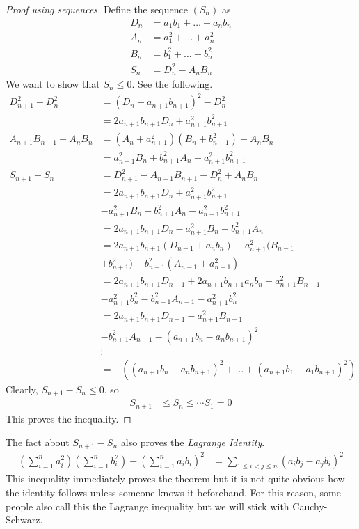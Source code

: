 \documentclass{subfile}
\begin{document}
		\begin{proof}[\itshape Proof using sequences]
			Define the sequence $(S_n)$ as
				\begin{align*}
					D_n
						& = a_1b_1+\ldots+a_nb_n\\
					A_n
						& = a_1^2+\ldots+a_n^2\\
					B_n
						& = b_1^2+\ldots+b_n^2\\
					S_n
						& = D_n^2-A_nB_n
				\end{align*}
			We want to show that $S_n\leq0$. See the following.
				\begin{align*}
					D_{n+1}^2-D_n^2
						& = (D_n+a_{n+1}b_{n+1})^2-D_n^2\\
						& = 2a_{n+1}b_{n+1}D_n+a_{n+1}^2b_{n+1}^2\\
					A_{n+1}B_{n+1}-A_nB_n
						& = (A_n+a_{n+1}^2)(B_n+b_{n+1}^2)-A_nB_n\\
						& = a_{n+1}^2B_n+b_{n+1}^2A_n+a_{n+1}^2b_{n+1}^2\\
					S_{n+1}-S_n
						& = D_{n+1}^2-A_{n+1}B_{n+1}-D_n^2+A_nB_n\\
						& = 2a_{n+1}b_{n+1}D_n+a_{n+1}^2b_{n+1}^2\\
						& -a_{n+1}^2B_n-b_{n+1}^2A_n-a_{n+1}^2b_{n+1}^2\\
						& = 2a_{n+1}b_{n+1}D_n-a_{n+1}^2B_n-b_{n+1}^2A_n\\
						& = 2a_{n+1}b_{n+1}(D_{n-1}+a_nb_n)-a_{n+1}^2(B_{n-1}\\
						& +b_{n+1}^2)-b_{n+1}^2(A_{n-1}+a_{n+1}^2)\\
						& = 2a_{n+1}b_{n+1}D_{n-1}+2a_{n+1}b_{n+1}a_nb_n-a_{n+1}^2B_{n-1}\\
						& -a_{n+1}^2b_{n}^2-b_{n+1}^2A_{n-1}-a_{n+1}^2b_{n}^2\\
						& = 2a_{n+1}b_{n+1}D_{n-1}-a_{n+1}^2B_{n-1}\\
						& -b_{n+1}^2A_{n-1}-(a_{n+1}b_n-a_{n}b_{n+1})^2\\
						& \vdots\\
						& = -\left((a_{n+1}b_n-a_nb_{n+1})^2+\ldots+(a_{n+1}b_1-a_1b_{n+1})^2\right)
				\end{align*}
			Clearly, $S_{n+1}-S_n\leq0$, so
				\begin{align*}
					S_{n+1}
						& \leq S_n\leq\cdots S_1=0
				\end{align*}
			This proves the inequality.
		\end{proof}
	The fact about $S_{n+1}-S_n$ also proves the \textit{Lagrange Identity}.
		\begin{align*}
			\left(\sum_{i=1}^na_i^2\right)\left(\sum_{i=1}^nb_i^2\right)-\left(\sum_{i=1}^na_ib_i\right)^2
				& = \sum_{1\leq i< j\leq n}(a_ib_j-a_jb_i)^2
		\end{align*}
	This inequality immediately proves the theorem but it is not quite obvious how the identity follows unless someone knows it beforehand. For this reason, some people also call this the Lagrange inequality but we will stick with Cauchy-Schwarz. %
\end{document}
